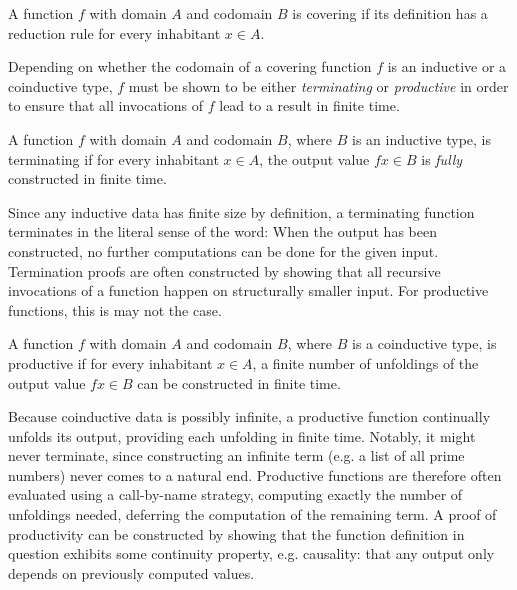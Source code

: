 \begin{definition}
  \label{def:covering_function}
  A function $f$ with domain $A$ and codomain $B$ is covering if its definition
  has a reduction rule for every inhabitant $x\in A$.
\end{definition}

Depending on whether the codomain of a covering function $f$ is an inductive or
a coinductive type, $f$ must be shown to be either \emph{terminating} or
\emph{productive} in order to ensure that all invocations of $f$ lead to a
result in finite time.

\begin{definition}
\label{def:terminating_function}
  A function $f$ with domain $A$ and codomain $B$, where $B$ is an inductive
  type, is terminating if for every inhabitant $x\in A$, the output value
  $f x\in B$ is \emph{fully} constructed in finite time.
\end{definition}

Since any inductive data has finite size by definition, a terminating function
terminates in the literal sense of the word: When the output has been
constructed, no further computations can be done for the given
input. Termination proofs are often constructed by showing that all recursive
invocations of a function happen on structurally smaller input. For
productive functions, this is may not the case.

\begin{definition}
\label{def:productive_function}
  A function $f$ with domain $A$ and codomain $B$, where $B$ is a coinductive
  type, is productive if for every inhabitant $x\in A$, a finite number of
  unfoldings of the output value $f x\in B$ can be constructed in finite time.
\end{definition}

Because coinductive data is possibly infinite, a productive function continually
unfolds its output, providing each unfolding in finite time. Notably, it might
never terminate, since constructing an infinite term (e.g. a list of all prime
numbers) never comes to a natural end. Productive functions are therefore often
evaluated using a call-by-name strategy, computing exactly the number of
unfoldings needed, deferring the computation of the remaining term.  A proof
of productivity can be constructed by showing that the function definition in
question exhibits some continuity property, e.g. causality: that any output only
depends on previously computed values.

